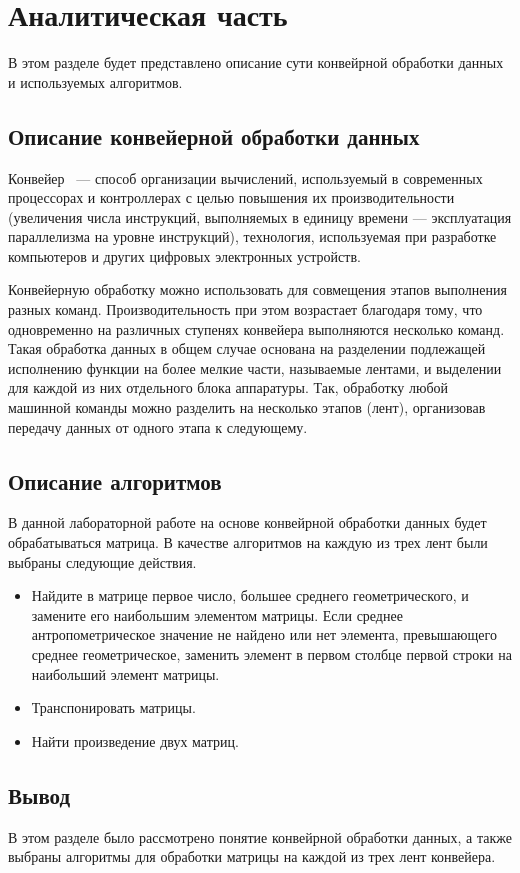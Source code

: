 \chapter{Аналитическая часть}
В этом разделе будет представлено описание сути конвейрной обработки данных и используемых алгоритмов.

\section{Описание конвейерной обработки данных}

Конвейер~\cite{bib1} --- способ организации вычислений, используемый в современных процессорах и контроллерах с целью повышения их производительности (увеличения числа инструкций, выполняемых в единицу времени — эксплуатация параллелизма на уровне инструкций), технология, используемая при разработке компьютеров и других цифровых электронных устройств.

Конвейерную обработку можно использовать для совмещения этапов выполнения разных команд. Производительность при этом возрастает благодаря тому, что одновременно на различных ступенях конвейера выполняются несколько команд. Такая обработка данных в общем случае основана на разделении подлежащей исполнению функции на более мелкие части, называемые лентами, и выделении для каждой из них отдельного блока аппаратуры. Так, обработку любой машинной команды можно разделить на несколько этапов (лент), организовав передачу данных от одного этапа к следующему.

\section{Описание алгоритмов}

В данной лабораторной работе на основе конвейрной обработки данных будет обрабатываться матрица. В качестве алгоритмов на каждую из трех лент были выбраны следующие действия.

\begin{itemize}[label = ---]
    \item Найдите в матрице первое число, большее среднего геометрического, и замените его наибольшим элементом матрицы. Если среднее антропометрическое значение не найдено или нет элемента, превышающего среднее геометрическое, заменить элемент в первом столбце первой строки на наибольший элемент матрицы.
    \item Транспонировать матрицы.
    \item Найти произведение двух матриц.
\end{itemize}

\section*{Вывод}

В этом разделе было рассмотрено понятие конвейрной обработки данных, а также выбраны алгоритмы для обработки матрицы на каждой из трех лент конвейера.